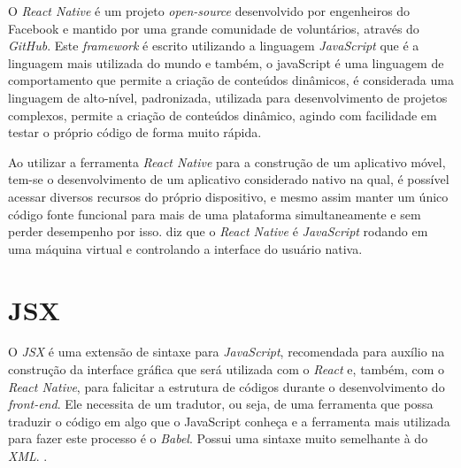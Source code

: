 O \textit{React Native} é um projeto \textit{open-source} desenvolvido por engenheiros do Facebook e mantido por uma grande comunidade de voluntários, através do \textit{GitHub}. Este \textit{framework} é escrito utilizando a linguagem \textit{JavaScript} que é a linguagem mais utilizada do mundo e também, o javaScript é uma linguagem de comportamento que permite a criação de conteúdos dinâmicos, é considerada uma linguagem de alto-nível, padronizada, utilizada para desenvolvimento de projetos complexos, permite a criação de conteúdos dinâmico, agindo com facilidade em testar o próprio código de forma muito rápida. \cite{javascript}

Ao utilizar a ferramenta \textit{React Native} para a construção de um aplicativo móvel, tem-se o desenvolvimento de um aplicativo considerado nativo na qual, é possível acessar diversos recursos do próprio dispositivo, e mesmo assim manter um único código fonte funcional para mais de uma plataforma simultaneamente e sem perder desempenho por isso. 
 diz que o \textit{React Native} é \textit{JavaScript} rodando em uma máquina virtual e controlando a interface do usuário nativa.



\section{JSX}
O \textit{JSX} é uma extensão de sintaxe para \textit{JavaScript}, recomendada para auxílio na construção da interface gráfica que será utilizada com o \textit{React} e, também, com o \textit{React Native}, para falicitar a estrutura de códigos durante o desenvolvimento do \textit{front-end}. Ele necessita de um tradutor, ou seja, de uma ferramenta que possa traduzir o código em algo que o JavaScript conheça e a ferramenta mais utilizada para fazer este processo é o \textit{Babel}. Possui uma sintaxe muito semelhante à do \textit{XML}.  
\cite{jsx}.


